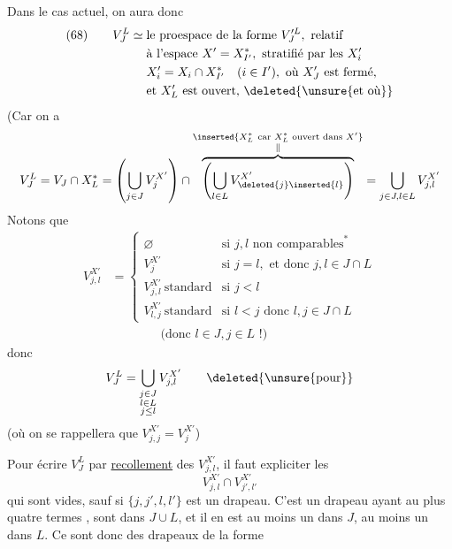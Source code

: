 
Dans le cas actuel, on aura donc
\[
\begin{aligned}
(68)\qquad V_J^L\simeq{}&\text{le proespace de la forme }V_J^{\prime L},\text{ relatif}\\
&\text{à l'espace }X'=X_{I'}^*,\text{ stratifié par les }X_i'\\
&X_i'=X_i\cap X_{I'}^*\quad(i\in I'),\text{ où }X_J'\text{ est fermé,}\\
&\text{et }X_L'\text{ est ouvert, }\deleted{\unsure{\text{et où}}}
\end{aligned}
\]
(Car on a
\[
V_J^L=V_J\cap X_L^*
=\left(\bigcup_{j\in J}V_j^{X'}\right)\cap
\overbrace{\left(\bigcup_{l\in L}V_{\deleted{j}\inserted{l}}^{X'}\right)}^{\substack{\inserted{X_L^*\ \text{car }X_L^*\text{ ouvert dans }X'}\\\Vert}}
=\bigcup_{j\in J,l\in L}V_{j,l}^{X'}
\]
Notons que
\[
\begin{aligned}
V_{j,l}^{X'}&=
\begin{cases}
\varnothing&\text{si }j,l\text{ non comparables}^*\\
V_j^{X'}&\text{si }j=l,\text{ et donc }j,l\in J\cap L\\
V_{j,l}^{X'}\ \text{standard}&\text{si }j<l\\
V_{l,j}^{X'}\ \text{standard}&\text{si }l<j\text{ donc }l,j\in J\cap L
\end{cases}\\
&\qquad\qquad\text{(donc }l\in J,j\in L\text{ !)}
\end{aligned}
\]
donc
\[
V_J^L=\bigcup_{\substack{j\in J\\l\in L\\j\leq l}}V_{j,l}^{X'}\qquad\deleted{\text{\unsure{pour}}}
\]
(où on se rappellera que $V_{j,j}^{X'}=V_j^{X'}$)


Pour écrire $V_J^L$ par \uline{recollement} des $V_{j,l}^{X'}$, il faut expliciter les
\[
V_{j,l}^{X'}\cap V_{j',l'}^{X'}
\]
qui sont vides, sauf si $\{j,j',l,l'\}$ est un drapeau. C'est un drapeau  ayant au plus quatre termes ,   sont dans $J\cup L$, et il en est au  moins un dans $J$, au moins un dans $L$. Ce sont donc des drapeaux de la forme
